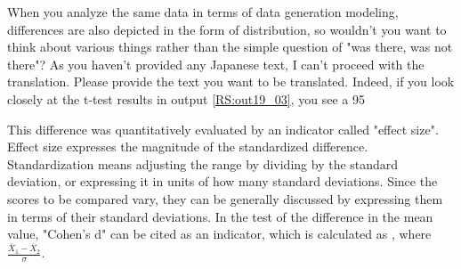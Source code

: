 \documentclass{ltjsbook}
\begin{document}
{%
When you analyze the same data in terms of data generation modeling, differences are also depicted in the form of distribution, so wouldn't you want to think about various things rather than the simple question of "was there, was not there"?
As you haven't provided any Japanese text, I can't proceed with the translation. Please provide the text you want to be translated.
Indeed, if you look closely at the t-test results in output \ref{RS:out19_03}, you see a 95%

This difference was quantitatively evaluated by an indicator called "effect size". Effect size expresses the magnitude of the standardized difference. Standardization means adjusting the range by dividing by the standard deviation, or expressing it in units of how many standard deviations. Since the scores to be compared vary, they can be generally discussed by expressing them in terms of their standard deviations. In the test of the difference in the mean value, "Cohen's d" can be cited as an indicator, which is calculated as , where$\frac{\bar{X}_1-\bar{X}_2}{\sigma}$.


}
\end{document}
